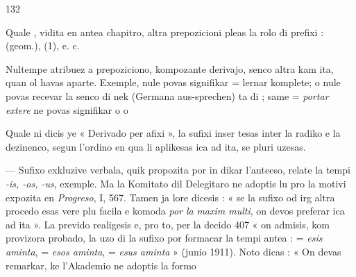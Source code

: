 \begin{VUpage}[136]{132}

\VUsaut{4.22mm}

Quale , vidita en antea chapitro, altra prepozicioni\nl
pleas la rolo di prefixi : \cc
{} (geom.),  (1), \cc
{} e. c.

Nultempe atribuez a prepoziciono, kompozante derivajo,\nl
senco altra kam ita, quan ol havas aparte. Exemple, \nl
nule povas signifikar  = lernar komplete; \nl
o  nule povas recevar la senco di  nek\nl
{} (Germana aus-sprechen) ta di ; same\nl
{} = \textit{portar extere} ne povas signifikar o  o\nl
{}

\VUsaut{3.40mm}
\VUsaut{4.24mm}

Quale ni dicis ye « Derivado per afixi », la sufixi inser\cc
tesas inter la radiko e la dezinenco, segun l'ordino en qua\nl
li aplikesas ica ad ita, se pluri uzesas.

 --- Sufixo exkluzive verbala, quik propozita por in\cc
dikar l'anteeso, relate la tempi \textit{-is, -os, -us}, exemple. Ma la\nl
Komitato dil Delegitaro ne adoptis lu pro la motivi expozita\nl
en \textit{Progreso}, I, 567. Tamen ja lore dicesis : « se la sufixo \nl
od irg altra procedo esas vere plu facila e komoda \textit{por la}\nl
\textit{maxim multi}, on devos preferar ica ad ita ». La prevido\nl
realigesis e, pro to, per la decido 407 « on admisis, kom\nl
provizora probado, la uzo di la sufixo  por formacar la\nl
tempi antea :  = \textit{esis aminta},  = \textit{esos aminta},\nl
{} = \textit{esus aminta} » (junio 1911). Noto dicas : « On\nl
devas remarkar, ke l'Akademio ne adoptis la formo\parplein
\end{VUpage}

